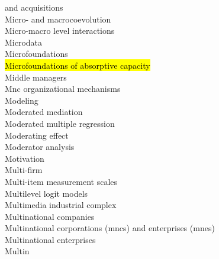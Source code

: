 \documentclass[a4paper]{article}
\begin{document}
\begin{multicols*}{2}
\begin{footnotesize}
 and acquisitions \\ Micro- and macrocoevolution \\ Micro-macro level interactions \\ Microdata \\ Microfoundations \\ \hl{Microfoundations of absorptive capacity} \\ Middle managers \\ Mnc organizational mechanisms \\ Modeling \\ Moderated mediation \\ Moderated multiple regression \\ Moderating effect \\ Moderator analysis \\ Motivation \\ Multi-firm \\ Multi-item measurement scales \\ Multilevel logit models \\ Multimedia industrial complex \\ Multinational companies \\ Multinational corporations (mncs) and enterprises (mnes) \\ Multinational enterprises \\ Multin
\end{footnotesize}
\end{multicols*}
\end{document}
